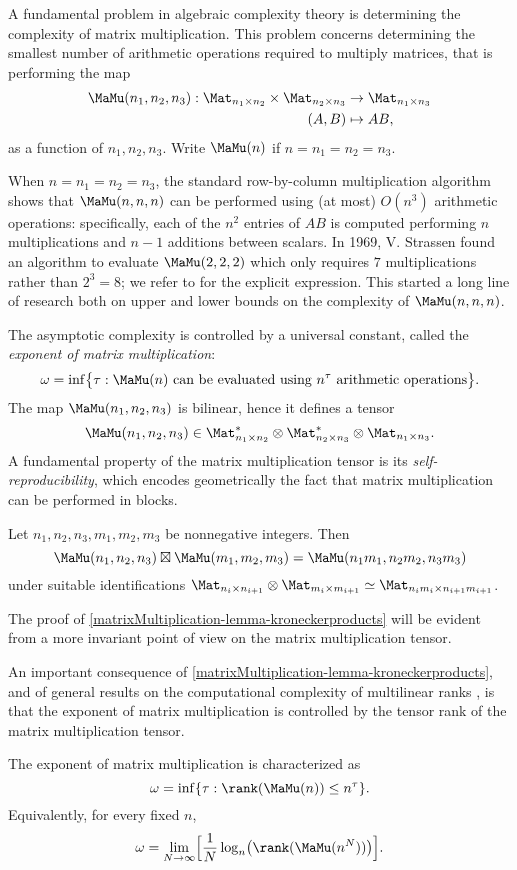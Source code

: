 A fundamental problem in algebraic complexity theory is determining the complexity of matrix multiplication. This problem concerns determining the smallest number of arithmetic operations required to multiply matrices, that is performing the map 
\[
\begin{aligned}
\MaMu(n_1,n_2,n_3) : \Mat_{n_1 \times n_2} \times \Mat_{n_2 \times n_3} &\to \Mat_{n_1 \times n_3} \\
(A , B) &\mapsto AB,
\end{aligned}
\]
as a function of $n_1,n_2,n_3$. Write $\MaMu(n)$ if $n=n_1=n_2=n_3$.

When $n = n_1=n_2=n_3$, the standard row-by-column multiplication algorithm shows that $\MaMu(n,n,n)$ can be performed using (at most) $O(n^3)$ arithmetic operations: specifically, each of the $n^2$ entries of $AB$ is computed performing $n$ multiplications and $n-1$ additions between scalars. In 1969, V. Strassen \cite{Str69} found an algorithm to evaluate $\MaMu(2,2,2)$ which only requires $7$ multiplications rather than $2^3 = 8$; we refer to \cite[Section 1.1.1]{Lan12} for the explicit expression. This started a long line of research both on upper and lower bounds on the complexity of $\MaMu(n,n,n)$. 

The asymptotic complexity is controlled by a universal constant, called the \emph{exponent of matrix multiplication}:
\[
\omega = \inf \bigl\{ \tau : \MaMu(n) \text{ can be evaluated using $n^\tau$ arithmetic operations} \bigr\}.
\]
The map $\MaMu(n_1,n_2,n_3)$ is bilinear, hence it defines a tensor 
\[
\MaMu(n_1,n_2,n_3) \in \Mat_{n_1 \times n_2}^* \otimes \Mat_{n_2 \times n_3}^* \otimes \Mat_{n_1 \times n_3}.
\]
A fundamental property of the matrix multiplication tensor is its \emph{self-reproducibility}, which encodes geometrically the fact that matrix multiplication can be performed in blocks.
\begin{lemma}
\label{matrixMultiplication-lemma-kroneckerproducts}
Let $n_1,n_2,n_3,m_1,m_2,m_3$ be nonnegative integers. Then 
 \[
\MaMu(n_1,n_2,n_3) \boxtimes \MaMu(m_1,m_2,m_3) = \MaMu(n_1m_1,n_2m_2,n_3m_3) 
\]
under suitable identifications $\Mat_{n_i \times n_{i+1}} \otimes \Mat_{m_i \times m_{i+1}} \simeq \Mat_{n_im_i \times n_{i+1}m_{i+1}}$.
\end{lemma}
The proof of \ref{matrixMultiplication-lemma-kroneckerproducts} will be evident from a more invariant point of view on the matrix multiplication tensor.

An important consequence of \ref{matrixMultiplication-lemma-kroneckerproducts}, and of general results on the computational complexity of multilinear ranks \cite[Ch.14]{BCS97}, is that the exponent of matrix multiplication is controlled by the tensor rank of the matrix multiplication tensor.
\begin{theorem}
\label{matrixMultiplication-thm-exponentasrank}
The exponent of matrix multiplication is characterized as 
\[
\omega = \inf \{ \tau : \rank(\MaMu(n))  \leq n^\tau \} .
\]
Equivalently, for every fixed $n$,
\[
\omega = \lim_{N \to \infty} \Bigl[ \frac{1}{N} \log_n \bigl(\rank  (\MaMu(n^N) ) \bigr) \Bigr].
\]
\end{theorem}



